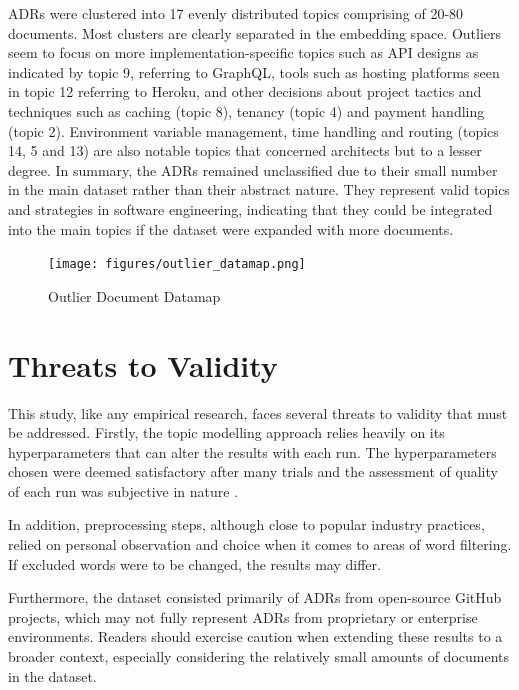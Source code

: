         ADRs were clustered into 17 evenly distributed topics comprising of 20-80 documents. Most clusters are clearly separated in the embedding space. Outliers seem to focus on more implementation-specific topics such as API designs as indicated by topic 9, referring to GraphQL, tools such as hosting platforms seen in topic 12 referring to Heroku, and other decisions about project tactics and techniques such as caching (topic 8), tenancy (topic 4) and payment handling (topic 2). Environment variable management, time handling and routing (topics 14, 5 and 13) are also notable topics that concerned architects but to a lesser degree. In summary, the ADRs remained unclassified due to their small number in the main dataset rather than their abstract nature. They represent valid topics and strategies in software engineering, indicating that they could be integrated into the main topics if the dataset were expanded with more documents.
        
        \begin{figure}[H]
            \centering
            \hspace*{-1.2cm} 
            \texttt{[image: figures/outlier\_datamap.png]}
            \caption{Outlier Document Datamap}
            \label{fig:outlier_datamap}
        \end{figure}

    \newpage
    \section{Threats to Validity}
    This study, like any empirical research, faces several threats to validity that must be addressed. Firstly, the topic modelling approach relies heavily on its hyperparameters that can alter the results with each run. The hyperparameters chosen were deemed satisfactory after many trials and the assessment of quality of each run was subjective in nature \cite{subjective_topic_modelling}.

    In addition, preprocessing steps, although close to popular industry practices, relied on personal observation and choice when it comes to areas of word filtering. If excluded words were to be changed, the results may differ.
    
    Furthermore, the dataset consisted primarily of ADRs from open-source GitHub projects, which may not fully represent ADRs from proprietary or enterprise environments. Readers should exercise caution when extending these results to a broader context, especially considering the relatively small amounts of documents in the dataset.
    
